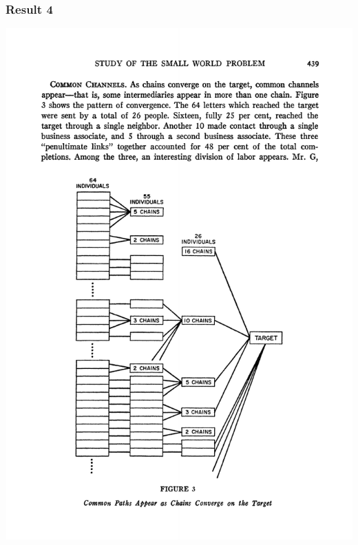 \documentclass[aspectratio=169]{beamer}
\begin{document}
\begin{frame}
\frametitle{Result 4}

\begin{center}
\includegraphics[height=0.9\textheight]{figures/travers_experimental_1969_fig3}
\end{center}


\end{frame}
\end{document}
